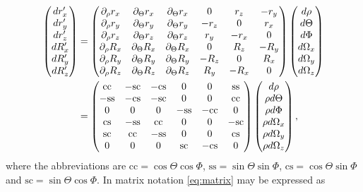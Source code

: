 \begin{align}
\begin{pmatrix}
d r'_x \\
d r'_y \\
d r'_z \\
d R'_x \\
d R'_y \\
d R'_z\\
\end{pmatrix} 
&= 
\begin{pmatrix*}[c]
\partial_{\rho} r_x & \partial_{\Theta} r_x & \partial_{\Theta} r_x & 0 & r_z & -r_y\\
\partial_{\rho} r_y & \partial_{\Theta} r_y & \partial_{\Theta} r_y & -r_z & 0 & r_x\\
\partial_{\rho} r_z & \partial_{\Theta} r_z & \partial_{\Theta} r_z & r_y & -r_x & 0\\
\partial_{\rho} R_x & \partial_{\Theta} R_x & \partial_{\Theta} R_x & 0 & R_z & -R_y\\
\partial_{\rho} R_y & \partial_{\Theta} R_y & \partial_{\Theta} R_y & -R_z & 0 & R_x\\
\partial_{\rho} R_z & \partial_{\Theta} R_z & \partial_{\Theta} R_z & R_y & -R_x & 0\\
\end{pmatrix*}
\begin{pmatrix}
d\rho\\
d\Theta\\
d\Phi\\
d\Omega_x\\
d\Omega_y\\
d\Omega_z\\
\end{pmatrix} \notag \\
&=
\begin{pmatrix*}[c]
\mathrm{cc} & \mathrm{-sc} & \mathrm{-cs} & 0 & 0 & \mathrm{ss}\\
\mathrm{-ss} & \mathrm{-cs} & \mathrm{-sc} & 0 & 0 & \mathrm{cc}\\
0 & 0 & 0 & \mathrm{-ss} & \mathrm{-cc} & 0\\
\mathrm{cs} & \mathrm{-ss} & \mathrm{cc} & 0 & 0 & \mathrm{-sc}\\
\mathrm{sc} & \mathrm{cc} & \mathrm{-ss} & 0 & 0 & \mathrm{cs}\\
0 & 0 & 0 & \mathrm{sc} & \mathrm{-cs} & 0\\
\end{pmatrix*}
\begin{pmatrix}
d\rho\\
\rho d\Theta\\
\rho d\Phi\\
\rho d\Omega_x\\
\rho d\Omega_y\\
\rho d\Omega_z\\
\end{pmatrix},\label{eq:matrix}
\end{align}
where the abbreviations are $\mathrm{cc} = \cos\Theta\cos\Phi$, $\mathrm{ss} = \sin\Theta\sin\Phi$, $\mathrm{cs} = \cos\Theta\sin\Phi$ and $\mathrm{sc} = \sin\Theta\cos\Phi$. In matrix notation \eqref{eq:matrix} may be expressed as


